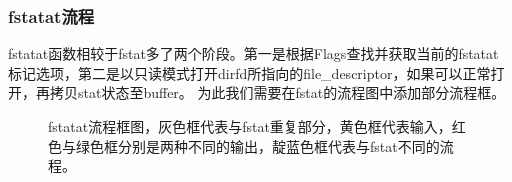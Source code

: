 \subsubsection{fstatat流程}
fstatat函数相较于fstat多了两个阶段。第一是根据Flags查找并获取当前的fstatat标记选项，第二是以只读模式打开dirfd所指向的file_descriptor，如果可以正常打开，再拷贝stat状态至buffer。
为此我们需要在fstat的流程图中添加部分流程框。
\begin{figure}[H]
    \centering
    \caption{fstatat流程框图，灰色框代表与fstat重复部分，黄色框代表输入，红色与绿色框分别是两种不同的输出，靛蓝色框代表与fstat不同的流程。}
\end{figure}
